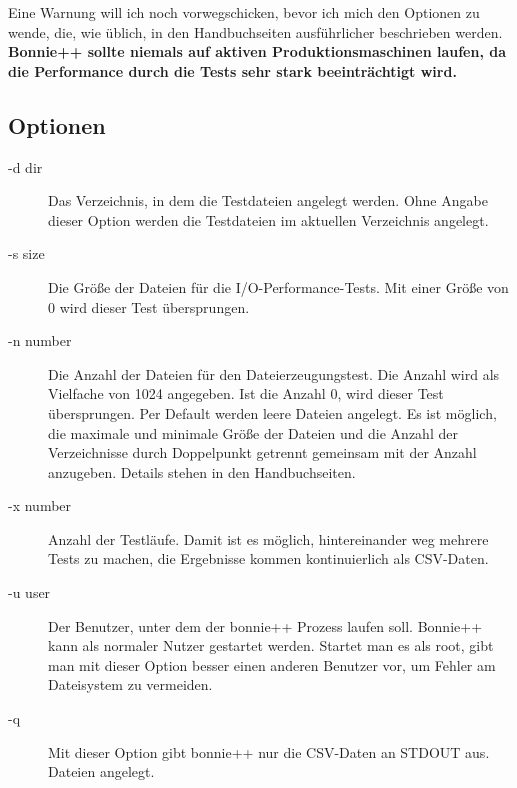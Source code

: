 \begin{normaltext}
  Eine Warnung will ich noch vorwegschicken, bevor ich mich den Optionen
  zu wende, die, wie üblich, in den Handbuchseiten ausführlicher beschrieben
  werden.
  {\bf Bonnie++ sollte niemals auf aktiven Produktionsmaschinen laufen, da die
  Performance durch die Tests sehr stark beeinträchtigt wird.}

  \subsection*{Optionen}
  \begin{description}
    \item[-d dir] Das Verzeichnis, in dem die Testdateien angelegt werden.
      Ohne Angabe dieser Option werden die Testdateien im aktuellen
      Verzeichnis angelegt.
    \item[-s size] Die Größe der Dateien für die I/O-Performance-Tests. Mit
      einer Größe von 0 wird dieser Test übersprungen.
    \item[-n number] Die Anzahl der Dateien für den Dateierzeugungstest. Die
      Anzahl wird als Vielfache von 1024 angegeben. Ist die Anzahl 0, wird
      dieser Test übersprungen. Per Default werden leere Dateien angelegt. Es
      ist möglich, die maximale und minimale Größe der Dateien und die Anzahl
      der Verzeichnisse durch Doppelpunkt getrennt gemeinsam mit der Anzahl
      anzugeben. Details stehen in den Handbuchseiten.
    \item[-x number] Anzahl der Testläufe. Damit ist es möglich,
      hintereinander weg mehrere Tests zu machen, die Ergebnisse kommen
      kontinuierlich als CSV-Daten.
    \item[-u user] Der Benutzer, unter dem der bonnie++ Prozess laufen soll.
      Bonnie++ kann als normaler Nutzer gestartet werden. Startet man es als
      root, gibt man mit dieser Option besser einen anderen Benutzer vor, um
      Fehler am Dateisystem zu vermeiden.
    \item[-q] Mit dieser Option gibt bonnie++ nur die CSV-Daten an STDOUT aus.
      Dateien angelegt.
  \end{description}
\end{normaltext}

